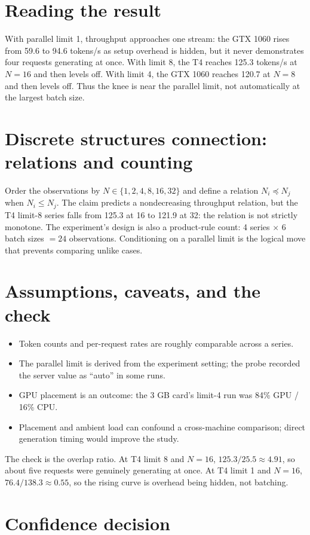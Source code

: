 \documentclass{article}
\begin{document}
\section{Reading the result}
With parallel limit 1, throughput approaches one stream: the GTX 1060 rises from 59.6 to 94.6 tokens/s as setup overhead is hidden, but it never demonstrates four requests generating at once. With limit 8, the T4 reaches 125.3 tokens/s at $N=16$ and then levels off. With limit 4, the GTX 1060 reaches 120.7 at $N=8$ and then levels off. Thus the knee is near the parallel limit, not automatically at the largest batch size.

\section{Discrete structures connection: relations and counting}
Order the observations by $N\in\{1,2,4,8,16,32\}$ and define a relation $N_i\preceq N_j$ when $N_i\leq N_j$. The claim predicts a nondecreasing throughput relation, but the T4 limit-8 series falls from 125.3 at 16 to 121.9 at 32: the relation is not strictly monotone. The experiment's design is also a product-rule count: 4 series $\times$ 6 batch sizes $=24$ observations. Conditioning on a parallel limit is the logical move that prevents comparing unlike cases.

\section{Assumptions, caveats, and the check}
\begin{itemize}
\item Token counts and per-request rates are roughly comparable across a series.
\item The parallel limit is derived from the experiment setting; the probe recorded the server value as ``auto'' in some runs.
\item GPU placement is an outcome: the 3 GB card's limit-4 run was 84\% GPU / 16\% CPU.
\item Placement and ambient load can confound a cross-machine comparison; direct generation timing would improve the study.
\end{itemize}
The check is the overlap ratio. At T4 limit 8 and $N=16$, $125.3/25.5\approx4.91$, so about five requests were genuinely generating at once. At T4 limit 1 and $N=16$, $76.4/138.3\approx0.55$, so the rising curve is overhead being hidden, not batching.

\section{Confidence decision}
\end{document}
